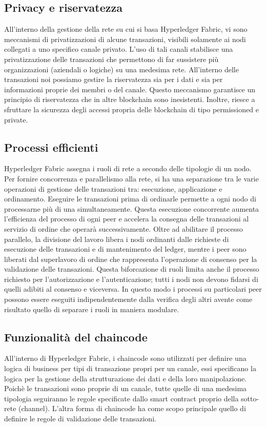 \subsection{Privacy e riservatezza}
All'interno della gestione della rete su cui si basa Hyperledger Fabric, vi sono meccanismi di privatizzazioni di alcune transazioni, visibili solamente ai nodi collegati a uno specifico canale privato. L'uso di tali canali stabilisce una privatizzazione delle transazioni che permettono di far sussistere più organizzazioni (aziendali o logiche) su una medesima rete. All'interno delle transazioni noi possiamo gestire la riservatezza sia per i dati e sia per informazioni proprie dei membri o del canale. Questo meccanismo garantisce un principio di riservatezza che in altre blockchain sono inesistenti. Inoltre, riesce a sfruttare la sicurezza degli accessi propria delle blockchain di tipo permissioned e private.
\subsection{Processi efficienti}
Hyperledger Fabric assegna i ruoli di rete a secondo delle tipologie di un nodo. Per fornire concorrenza e parallelismo alla rete, si ha una separazione tra le varie operazioni di gestione delle transazioni tra: esecuzione, applicazione e ordinamento. Eseguire le transazioni prima di ordinarle permette a ogni nodo di processarne più di una simultaneamente. Questa esecuzione concorrente aumenta l’efficienza del processo di ogni peer e accelera la consegna delle transazioni al servizio di ordine che operarà successivamente.
Oltre ad abilitare il processo parallelo, la divisione del lavoro libera i nodi ordinanti dalle richieste di esecuzione delle transazioni e di mantenimento del ledger, mentre i peer sono liberati dal superlavoro di ordine che rappresenta l'operazione di consenso per la validazione delle transazioni. Questa biforcazione di ruoli limita anche il processo richiesto per l’autorizzazione e l’autenticazione; tutti i nodi non devono fidarsi di quelli adibiti al consenso e viceversa. In questo modo i processi su particolari peer possono essere eseguiti indipendentemente dalla verifica degli altri avente come risultato quello di separare i ruoli in maniera modulare.
\subsection{Funzionalità del chaincode}
All'interno di Hyperledger Fabric, i chaincode sono utilizzati per definire una logica di business per tipi di transazione propri per un canale, essi specificano la logica per la gestione della strutturazione dei dati e della loro manipolazione. Poichè le transazioni sono proprie di un canale, tutte quelle di una medesima tipologia seguiranno le regole specificate dallo smart contract proprio della sotto-rete (channel). L'altra forma di chaincode ha come scopo principale quello di definire le regole di validazione delle transazioni. 
